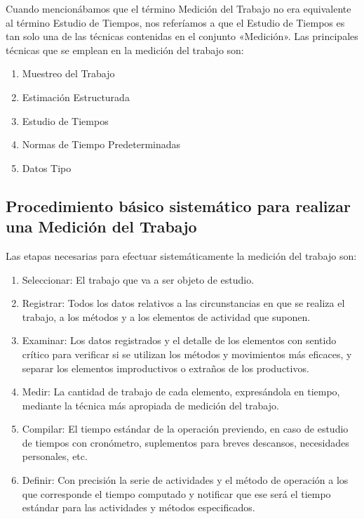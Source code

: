 \documentclass[../main]{subfiles}
\begin{document}
Cuando mencionábamos que el término Medición del Trabajo no era
equivalente al término Estudio de Tiempos, nos referíamos a que el
Estudio de Tiempos es tan solo una de las técnicas contenidas en el
conjunto «Medición». Las principales técnicas que se emplean en la
medición del trabajo son:

\begin{enumerate}
  \item Muestreo del Trabajo
  \item Estimación Estructurada
  \item Estudio de Tiempos
  \item Normas de Tiempo Predeterminadas
  \item Datos Tipo
\end{enumerate}

\subsection{Procedimiento básico sistemático para realizar una
Medición del Trabajo}
Las etapas necesarias para efectuar sistemáticamente la medición del
trabajo son:

\begin{enumerate}
  \item Seleccionar: El trabajo que va a ser objeto de estudio.
  \item Registrar: Todos los datos relativos a las circunstancias en
    que se realiza el trabajo, a los métodos y a los elementos de
    actividad que suponen.
  \item Examinar: Los datos registrados y el detalle de los elementos
    con sentido crítico para verificar si se utilizan los métodos y
    movimientos más eficaces, y separar los elementos improductivos o
    extraños de los productivos.
  \item Medir: La cantidad de trabajo de cada elemento, expresándola
    en tiempo, mediante la técnica más apropiada de medición del trabajo.
  \item Compilar: El tiempo estándar de la operación previendo, en
    caso de estudio de tiempos con cronómetro, suplementos para
    breves descansos, necesidades personales, etc.
  \item Definir: Con precisión la serie de actividades y el método de
    operación a los que corresponde el tiempo computado y notificar
    que ese será el tiempo estándar para las actividades y métodos
    especificados.

\end{enumerate}
\end{document}

